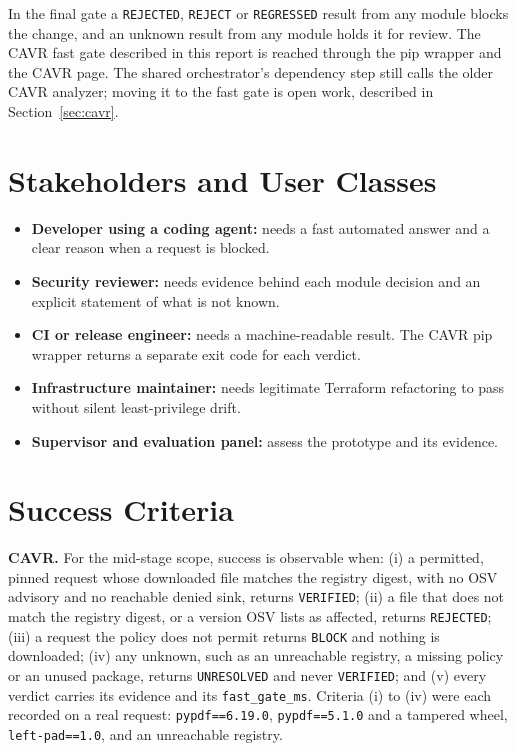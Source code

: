 \setlength{\tabcolsep}{6pt}
\begin{sloppypar}
In the final gate a \texttt{REJECTED}, \texttt{REJECT} or \texttt{REGRESSED} result from any module blocks the change, and an unknown result from any module holds it for review. The CAVR fast gate described in this report is reached through the pip wrapper and the CAVR page. The shared orchestrator's dependency step still calls the older CAVR analyzer; moving it to the fast gate is open work, described in Section~\ref{sec:cavr}.
\end{sloppypar}

\section{Stakeholders and User Classes}
\begin{itemize}
    \item \textbf{Developer using a coding agent:} needs a fast automated answer and a clear reason when a request is blocked.
    \item \textbf{Security reviewer:} needs evidence behind each module decision and an explicit statement of what is not known.
    \item \textbf{CI or release engineer:} needs a machine-readable result. The CAVR pip wrapper returns a separate exit code for each verdict.
    \item \textbf{Infrastructure maintainer:} needs legitimate Terraform refactoring to pass without silent least-privilege drift.
    \item \textbf{Supervisor and evaluation panel:} assess the prototype and its evidence.
\end{itemize}

\section{Success Criteria}
\begin{sloppypar}
\textbf{CAVR.} For the mid-stage scope, success is observable when: (i) a permitted, pinned request whose downloaded file matches the registry digest, with no OSV advisory and no reachable denied sink, returns \texttt{VERIFIED}; (ii) a file that does not match the registry digest, or a version OSV lists as affected, returns \texttt{REJECTED}; (iii) a request the policy does not permit returns \texttt{BLOCK} and nothing is downloaded; (iv) any unknown, such as an unreachable registry, a missing policy or an unused package, returns \texttt{UNRESOLVED} and never \texttt{VERIFIED}; and (v) every verdict carries its evidence and its \texttt{fast\_gate\_ms}. Criteria (i) to (iv) were each recorded on a real request: \texttt{pypdf==6.19.0}, \texttt{pypdf==5.1.0} and a tampered wheel, \texttt{left-pad==1.0}, and an unreachable registry.
\end{sloppypar}

